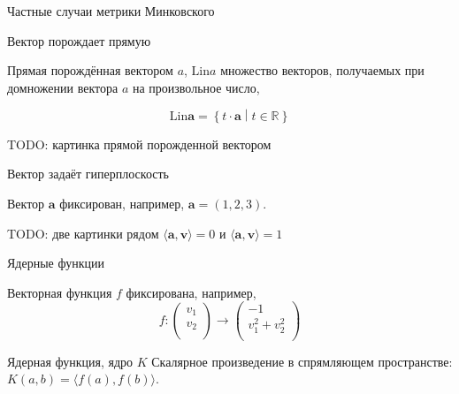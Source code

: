 \documentclass[14 pt,xcolor=dvipsnames]{beamer}
\newcommand{\R}{\mathbb{R}}
\newcommand{\ba}{\symbf{a}}
\newcommand{\bb}{\symbf{b}}
\newcommand{\bv}{\symbf{v}}
\newcommand{\Lin}{\mathrm{Lin}}
\begin{document}
\begin{frame}{Частные случаи метрики Минковского}

    


\end{frame}



\begin{frame}{Вектор порождает прямую}

\begin{block}{Прямая порождённая вектором $a$, $\Lin a$}
множество векторов, получаемых при домножении вектора $a$ на произвольное число,
\end{block}
\[
\Lin \ba = \left\{t\cdot \ba \middle| t \in \R \right\}  
\]

\begin{block}{TODO: картинка прямой порожденной вектором}
\end{block}

\end{frame}


\begin{frame}{Вектор задаёт гиперплоскость}

Вектор $\ba$ фиксирован, например, $\ba=(1, 2, 3)$.

\begin{block}{TODO: две картинки рядом}
$\langle \ba, \bv \rangle = 0$ и $\langle \ba, \bv \rangle = 1$   
\end{block}


\end{frame}


\begin{frame}{Ядерные функции}

Векторная функция $f$ фиксирована, например, 
\[
  f : \begin{pmatrix}
    v_1 \\
    v_2 \\
  \end{pmatrix} \to 
  \begin{pmatrix}
    -1 \\
    v_1^2 + v_2^2 \\
  \end{pmatrix}
\]

\begin{block}{Ядерная функция, ядро $K$}
Скалярное произведение в спрямляющем пространстве:
$K(a, b) = \langle f(a), f(b) \rangle$.
\end{block}
\end{frame}
\end{document}
